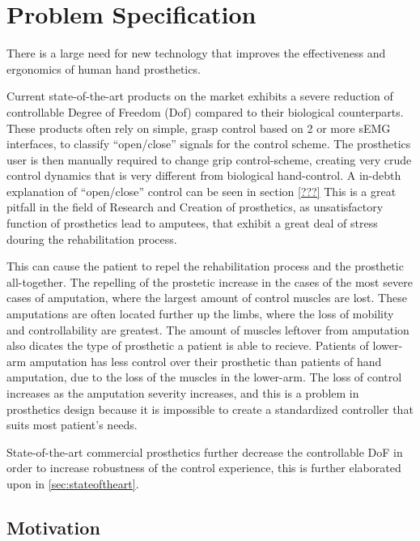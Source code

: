 \documentclass[../main.tex]{subfiles}
\begin{document}
\section{Problem Specification}

There is a large need for new technology that improves the effectiveness and ergonomics of human hand prosthetics.

Current state-of-the-art products on the market exhibits a severe reduction of controllable Degree of Freedom (Dof) compared to their biological counterparts.
These products often rely on simple, grasp control based on 2 or more \gls{sEMG} interfaces, to classify ``open/close'' signals for the control scheme.
The prosthetics user is then manually required to change grip control-scheme, creating very crude control dynamics that is very different from biological hand-control.
A in-debth explanation of ``open/close'' control can be seen in section \ref{???}
This is a great pitfall in the field of Research and Creation of prosthetics, as unsatisfactory function of prosthetics lead to amputees, that exhibit a great deal of stress douring the rehabilitation process.

This can cause the patient to repel the rehabilitation process and the prosthetic all-together.
The repelling of the prostetic increase in the cases of the most severe cases of amputation, where the largest amount of control muscles are lost.
These amputations are often located further up the limbs, where the loss of mobility and controllability are greatest.
The amount of muscles leftover from amputation also dicates the type of prosthetic a patient is able to recieve.
Patients of lower-arm amputation has less control over their prosthetic than patients of hand amputation, due to the loss of the muscles in the lower-arm.
The loss of control increases as the amputation severity increases, and this is a problem in prosthetics design because it is impossible to create a standardized controller that suits most patient's needs.

State-of-the-art commercial prosthetics further decrease the controllable DoF in order to increase robustness of the control experience, this is further elaborated upon in \ref{sec:stateoftheart}.

\subsection{Motivation}
\end{document}

